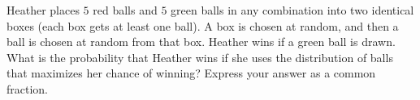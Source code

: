 Heather places $5$ red balls and $5$ green balls in any combination into two identical boxes (each box gets at least one ball). A box is chosen at random, and then a ball is chosen at random from that box. Heather wins if a green ball is drawn. What is the probability that Heather wins if she uses the distribution of balls that maximizes her chance of winning? Express your answer as a common fraction.
